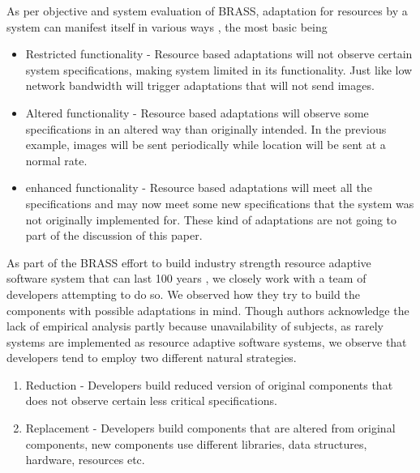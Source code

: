 As per objective and system evaluation of BRASS, adaptation for resources by a system can manifest itself in various ways \cite{darpa1}, the most basic being \begin{itemize}
\item Restricted functionality - Resource based adaptations will not observe certain system specifications, making system limited in its functionality. Just like low network bandwidth will trigger adaptations that will not send images.
\item Altered functionality - Resource based adaptations will observe some specifications in an altered way than originally intended. In the previous example, images will be sent periodically while location will be sent at a normal rate.
\item enhanced functionality - Resource based adaptations will meet all the specifications and may now meet some new specifications that the system was not originally implemented for. These kind of adaptations are not going to part of the discussion of this paper.  
\end{itemize}


As part of the BRASS effort to build industry strength resource adaptive software system that can last 100 years \cite{darpa2}, we closely work with a team of developers attempting to do so. We observed how they try to build the components with possible adaptations in mind. Though authors acknowledge the lack of empirical analysis partly because unavailability of subjects, as rarely systems are implemented as resource adaptive software systems, we observe that developers tend to employ two different natural strategies.

\begin{enumerate}
\item Reduction - Developers build reduced version of original components that does not observe certain less critical specifications.
\item Replacement - Developers build components that are altered from original components, new components use different libraries, data structures, hardware, resources etc.  
\end{enumerate}

